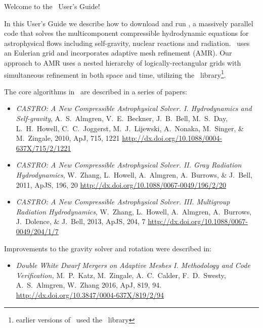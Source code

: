 
Welcome to the \castro\ User's Guide!

In this User's Guide we describe how to download and run \castro, a
massively parallel code that solves the multicomponent compressible
hydrodynamic equations for astrophysical flows including self-gravity,
nuclear reactions and radiation.  \castro\ uses an Eulerian grid and
incorporates adaptive mesh refinement (AMR).  Our approach to AMR uses
a nested hierarchy of logically-rectangular grids with simultaneous
refinement in both space and time, utilizing the
\amrex\ library\footnote{earlier versions of \castro\ used the
  \boxlib\ library}.

The core algorithms in \castro\ are described in a series of papers:
\begin{itemize}
\item {\it CASTRO: A New Compressible Astrophysical Solver. I. Hydrodynamics and Self-gravity},
  A.~S.~Almgren, V.~E.~Beckner, J.~B.~Bell, M.~S.~Day, L.~H.~Howell, C.~C.~Joggerst, M.~J.~Lijewski,
  A.~Nonaka, M.~Singer, \& M.~Zingale, 2010, ApJ, 715, 1221\newline
  \url{http://dx.doi.org/10.1088/0004-637X/715/2/1221}

\item {\it CASTRO: A New Compressible Astrophysical Solver. II. Gray Radiation Hydrodynamics},
  W.~Zhang, L.~Howell, A.~Almgren, A.~Burrows, \& J.~Bell, 2011, ApJS, 196, 20\newline
  \url{http://dx.doi.org/10.1088/0067-0049/196/2/20}

\item {\it CASTRO: A New Compressible Astrophysical Solver. III. Multigroup Radiation Hydrodynamics},
  W.~Zhang, L.~Howell, A.~Almgren, A.~Burrows, J.~Dolence, \& J.~Bell, 2013, ApJS, 204, 7\newline
  \url{http://dx.doi.org/10.1088/0067-0049/204/1/7}

\end{itemize}

Improvements to the gravity solver and rotation were described in:
\begin{itemize}
\item {\it Double White Dwarf Mergers on Adaptive Meshes I. Methodology
       and Code Verification, }
  M.~P.~Katz, M.~Zingale, A.~C.~Calder, F.~D.~Swesty, A.~S.~Almgren, W.~Zhang
  2016, ApJ, 819, 94.\newline
  \url{http://dx.doi.org/10.3847/0004-637X/819/2/94}
\end{itemize}

